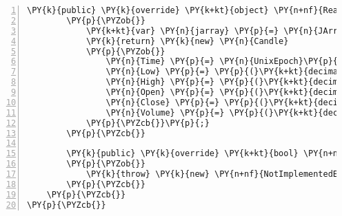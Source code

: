 \begin{Verbatim}[commandchars=\\\{\},numbers=left,firstnumber=1,stepnumber=1,numberblanklines=0]
        \PY{k}{public} \PY{k}{override} \PY{k+kt}{object} \PY{n+nf}{ReadJson}\PY{p}{(}\PY{n}{JsonReader} \PY{n}{reader}\PY{p}{,} \PY{n}{Type} \PY{n}{objectType}\PY{p}{,} \PY{k+kt}{object} \PY{n}{existingValue}\PY{p}{,} \PY{n}{JsonSerializer} \PY{n}{serializer}\PY{p}{)}
        \PY{p}{\PYZob{}}
            \PY{k+kt}{var} \PY{n}{jarray} \PY{p}{=} \PY{n}{JArray}\PY{p}{.}\PY{n}{Load}\PY{p}{(}\PY{n}{reader}\PY{p}{)}\PY{p}{;}
            \PY{k}{return} \PY{k}{new} \PY{n}{Candle}
            \PY{p}{\PYZob{}}
                \PY{n}{Time} \PY{p}{=} \PY{n}{UnixEpoch}\PY{p}{.}\PY{n}{AddSeconds}\PY{p}{(}\PY{p}{(}\PY{k+kt}{long}\PY{p}{)}\PY{n}{jarray}\PY{p}{.}\PY{n}{ElementAt}\PY{p}{(}\PY{l+m}{0}\PY{p}{)}\PY{p}{)}\PY{p}{,}
                \PY{n}{Low} \PY{p}{=} \PY{p}{(}\PY{k+kt}{decimal?}\PY{p}{)}\PY{n}{jarray}\PY{p}{.}\PY{n}{ElementAt}\PY{p}{(}\PY{l+m}{1}\PY{p}{)}\PY{p}{,}
                \PY{n}{High} \PY{p}{=} \PY{p}{(}\PY{k+kt}{decimal?}\PY{p}{)}\PY{n}{jarray}\PY{p}{.}\PY{n}{ElementAt}\PY{p}{(}\PY{l+m}{2}\PY{p}{)}\PY{p}{,}
                \PY{n}{Open} \PY{p}{=} \PY{p}{(}\PY{k+kt}{decimal?}\PY{p}{)}\PY{n}{jarray}\PY{p}{.}\PY{n}{ElementAt}\PY{p}{(}\PY{l+m}{3}\PY{p}{)}\PY{p}{,}
                \PY{n}{Close} \PY{p}{=} \PY{p}{(}\PY{k+kt}{decimal?}\PY{p}{)}\PY{n}{jarray}\PY{p}{.}\PY{n}{ElementAt}\PY{p}{(}\PY{l+m}{4}\PY{p}{)}\PY{p}{,}
                \PY{n}{Volume} \PY{p}{=} \PY{p}{(}\PY{k+kt}{decimal}\PY{p}{)}\PY{n}{jarray}\PY{p}{.}\PY{n}{ElementAt}\PY{p}{(}\PY{l+m}{5}\PY{p}{)}
            \PY{p}{\PYZcb{}}\PY{p}{;}
        \PY{p}{\PYZcb{}}

        \PY{k}{public} \PY{k}{override} \PY{k+kt}{bool} \PY{n+nf}{CanConvert}\PY{p}{(}\PY{n}{Type} \PY{n}{objectType}\PY{p}{)}
        \PY{p}{\PYZob{}}
            \PY{k}{throw} \PY{k}{new} \PY{n+nf}{NotImplementedException}\PY{p}{(}\PY{p}{)}\PY{p}{;}
        \PY{p}{\PYZcb{}}
    \PY{p}{\PYZcb{}}
\PY{p}{\PYZcb{}}
\end{Verbatim}
